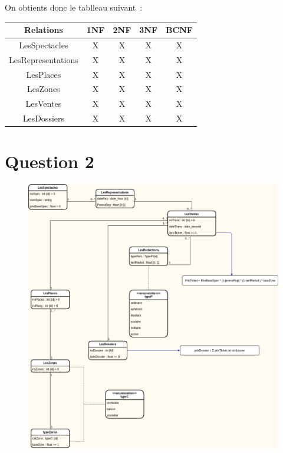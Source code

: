 \documentclass[a4paper, 10pt, twoside]{article}
\begin{document}
  On obtients donc le tablleau suivant~:\\[.25cm]
  \begin{tabular}{|c|c|c|c|c|}
    \hline
    \textbf{Relations}&\textbf{1NF}&\textbf{2NF}&\textbf{3NF}&\textbf{BCNF}\\
    \hline
    LesSpectacles&X&X&X&X\\
    \hline
    LesRepresentations&X&X&X&X\\
    \hline
    LesPlaces&X&X&X&X\\
    \hline
    LesZones&X&X&X&X\\
    \hline
    LesVentes&X&X&X&X\\
    \hline
    LesDossiers&X&X&X&X\\
    \hline
  \end{tabular}

\newpage
\thispagestyle{empty}

\section{Question 2}
  \begin{figure}[h]
    \centering
    \includegraphics[scale=0.5]{Theatre_UML.png}
  \end{figure}
\end{document}

